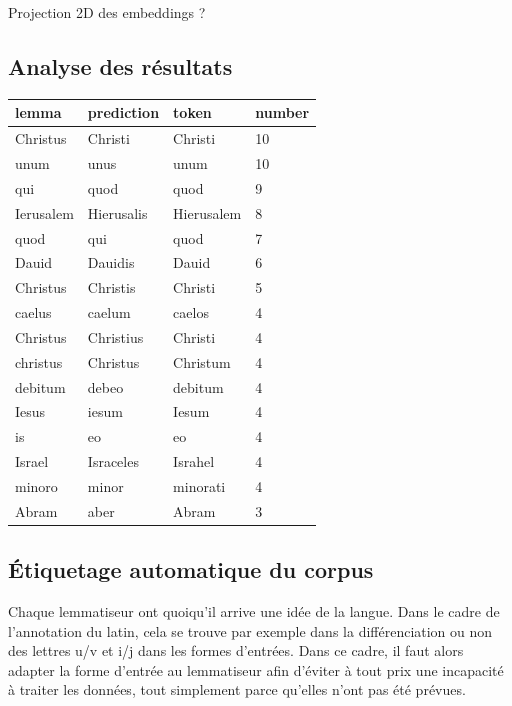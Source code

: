 Projection 2D des embeddings ?


\subsection{Analyse des résultats}
\label{subsec:lemma_resultats}

\begin{table}[]
\begin{tabular}{@{}llll@{}}
\toprule
lemma     & prediction & token      & number \\ \midrule
Christus  & Christi    & Christi    & 10     \\
unum      & unus       & unum       & 10     \\
qui       & quod       & quod       & 9      \\
Ierusalem & Hierusalis & Hierusalem & 8      \\
quod      & qui        & quod       & 7      \\
Dauid     & Dauidis    & Dauid      & 6      \\
Christus  & Christis   & Christi    & 5      \\
caelus    & caelum     & caelos     & 4      \\
Christus  & Christius  & Christi    & 4      \\
christus  & Christus   & Christum   & 4      \\
debitum   & debeo      & debitum    & 4      \\
Iesus     & iesum      & Iesum      & 4      \\
is        & eo         & eo         & 4      \\
Israel    & Israceles  & Israhel    & 4      \\
minoro    & minor      & minorati   & 4      \\
Abram     & aber       & Abram      & 3      \\ \bottomrule
\end{tabular}
\end{table}

\subsection{Étiquetage automatique du corpus}


Chaque lemmatiseur ont quoiqu'il arrive une idée de la langue. Dans le cadre de l'annotation du latin, cela se trouve par exemple dans la différenciation ou non des lettres u/v et i/j dans les formes d'entrées. Dans ce cadre, il faut alors adapter la forme d'entrée au lemmatiseur afin d'éviter à tout prix une incapacité à traiter les données, tout simplement parce qu'elles n'ont pas été prévues. %


